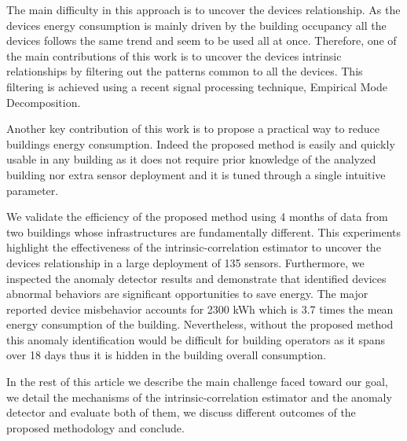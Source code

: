 The main difficulty in this approach is to uncover the devices relationship. 
As the devices energy consumption is mainly driven by the building occupancy all the devices follows the same trend and seem to be used all at once.
Therefore, one of the main contributions of this work is to uncover the devices intrinsic relationships by filtering out the patterns common to all the devices.
This filtering is achieved using a recent signal processing technique, Empirical Mode Decomposition.

Another key contribution of this work is to propose a practical way to reduce buildings energy consumption.
Indeed the proposed method is easily and quickly usable in any building as it does not require prior knowledge of the analyzed building nor extra sensor deployment and it is tuned through a single intuitive parameter.

We validate the efficiency of the proposed method using 4 months of data from two buildings whose infrastructures are fundamentally different.
This experiments highlight the effectiveness of the intrinsic-correlation estimator to uncover the devices relationship in a large deployment of 135 sensors.
Furthermore, we inspected the anomaly detector results and demonstrate that identified devices abnormal behaviors are significant opportunities to save energy.
The major reported device misbehavior accounts for 2300 kWh which is 3.7 times the mean energy consumption of the building.
Nevertheless, without the proposed method this anomaly identification would be difficult for building operators as it spans over 18 days thus it is hidden in the building overall consumption.

In the rest of this article we describe the main challenge faced toward our goal, we detail the mechanisms of the intrinsic-correlation estimator and the anomaly detector and evaluate both of them, we discuss different outcomes of the proposed methodology and conclude.
